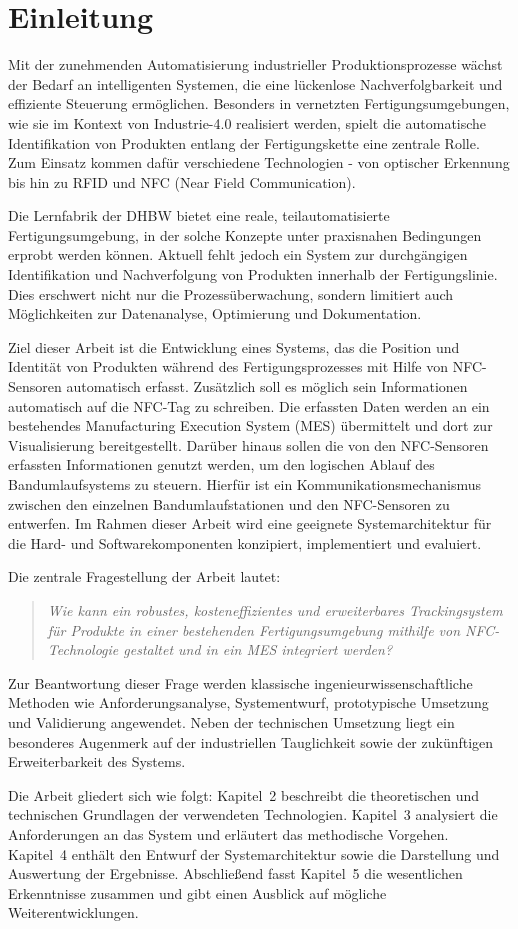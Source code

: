 \chapter{Einleitung}
\label{cha:Einleitung}

Mit der zunehmenden Automatisierung industrieller Produktionsprozesse wächst der Bedarf an intelligenten Systemen, die eine lückenlose Nachverfolgbarkeit und effiziente Steuerung ermöglichen.
Besonders in vernetzten Fertigungsumgebungen, wie sie im Kontext von Industrie-4.0 realisiert werden, spielt die automatische Identifikation von Produkten entlang der Fertigungskette eine zentrale Rolle. Zum Einsatz kommen dafür verschiedene Technologien - von optischer Erkennung bis hin zu RFID und NFC (Near Field Communication).

Die Lernfabrik der DHBW bietet eine reale, teilautomatisierte Fertigungsumgebung, in der solche Konzepte unter praxisnahen Bedingungen erprobt werden können. Aktuell fehlt jedoch ein System zur durchgängigen Identifikation und Nachverfolgung von Produkten innerhalb der Fertigungslinie. Dies erschwert nicht nur die Prozessüberwachung, sondern limitiert auch Möglichkeiten zur Datenanalyse, Optimierung und Dokumentation.

Ziel dieser Arbeit ist die Entwicklung eines Systems, das die Position und Identität von Produkten während des Fertigungsprozesses mit Hilfe von NFC-Sensoren automatisch erfasst. Zusätzlich soll es möglich sein Informationen automatisch auf die NFC-Tag zu schreiben. Die erfassten Daten werden an ein bestehendes Manufacturing Execution System (MES) übermittelt und dort zur Visualisierung bereitgestellt. Darüber hinaus sollen die von den NFC-Sensoren erfassten Informationen genutzt werden, um den logischen Ablauf des Bandumlaufsystems zu steuern. Hierfür ist ein Kommunikationsmechanismus zwischen den einzelnen Bandumlaufstationen und den NFC-Sensoren zu entwerfen. Im Rahmen dieser Arbeit wird eine geeignete Systemarchitektur für die Hard- und Softwarekomponenten konzipiert, implementiert und evaluiert.

Die zentrale Fragestellung der Arbeit lautet:
\begin{quote}
	\textit{Wie kann ein robustes, kosteneffizientes und erweiterbares Trackingsystem für Produkte in einer bestehenden Fertigungsumgebung mithilfe von NFC-Technologie gestaltet und in ein MES integriert werden?}
\end{quote}


Zur Beantwortung dieser Frage werden klassische ingenieurwissenschaftliche Methoden wie Anforderungsanalyse, Systementwurf, prototypische Umsetzung und Validierung angewendet. Neben der technischen Umsetzung liegt ein besonderes Augenmerk auf der industriellen Tauglichkeit sowie der zukünftigen Erweiterbarkeit des Systems.

Die Arbeit gliedert sich wie folgt:  
Kapitel~2 beschreibt die theoretischen und technischen Grundlagen der verwendeten Technologien. Kapitel~3 analysiert die Anforderungen an das System und erläutert das methodische Vorgehen. Kapitel~4 enthält den Entwurf der Systemarchitektur sowie die Darstellung und Auswertung der Ergebnisse. Abschließend fasst Kapitel~5 die wesentlichen Erkenntnisse zusammen und gibt einen Ausblick auf mögliche Weiterentwicklungen.
